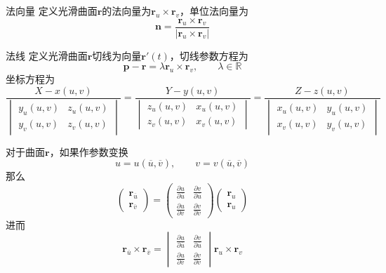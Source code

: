 \documentclass[lang = cn, scheme = chinese, thmcnt = section]{elegantbook}
\newcommand{\R}{\mathbb{R}}            %
\newcommand{\bs}{\boldsymbol}          %
\begin{document}
\begin{definition}{法向量}
	定义光滑曲面$\bs{r}$的法向量为$\bs{r}_u\times\bs{r}_v$，单位法向量为%
	$$
	\bs{n}=\frac{\bs{r}_u\times\bs{r}_v}{|\bs{r}_u\times\bs{r}_v|}
	$$
\end{definition}

\begin{definition}{法线}
	定义光滑曲面$\bs{r}$切线为向量$\bs{r}'(t)$，切线参数方程为
	$$
	\bs{p}-\bs{r}=\lambda\bs{r}_u\times\bs{r}_v,\qquad
	\lambda\in\R
	$$
	坐标方程为
	$$
	\frac{X-x(u,v)}{\begin{vmatrix}
			y_u(u,v) & z_u(u,v)\\
			y_v(u,v) & z_v(u,v)
	\end{vmatrix}}
	=\frac{Y-y(u,v)}{\begin{vmatrix}
			z_u(u,v) & x_u(u,v)\\
			z_v(u,v) & x_v(u,v)
	\end{vmatrix}}
	=\frac{Z-z(u,v)}{\begin{vmatrix}
			x_u(u,v) & y_u(u,v)\\
			x_v(u,v) & y_v(u,v)
	\end{vmatrix}}
	$$
\end{definition}

\begin{theorem}
	对于曲面$\bs{r}$，如果作参数变换%
	$$
	u=u(\overline{u},\overline{v}),\qquad 
	v=v(\overline{u},\overline{v})
	$$
	那么%
	$$
	\begin{pmatrix}
		\bs{r}_{\overline{u}}\\
		\bs{r}_{\overline{v}}
	\end{pmatrix}
	=\begin{pmatrix}
		\frac{\partial u}{\partial \overline{u}} & \frac{\partial v}{\partial \overline{u}}\\
		\frac{\partial u}{\partial \overline{v}} & \frac{\partial v}{\partial \overline{v}}
	\end{pmatrix}
	\begin{pmatrix}
		\bs{r}_{u}\\
		\bs{r}_{u}
	\end{pmatrix}
	$$
	进而%
	$$
	\bs{r}_{\overline{u}}\times\bs{r}_{\overline{v}}=\begin{vmatrix}
		\frac{\partial u}{\partial \overline{u}} & \frac{\partial v}{\partial \overline{u}}\\
		\frac{\partial u}{\partial \overline{v}} & \frac{\partial v}{\partial \overline{v}}
	\end{vmatrix}\bs{r}_u\times\bs{r}_v
	$$
\end{theorem}
\end{document}
